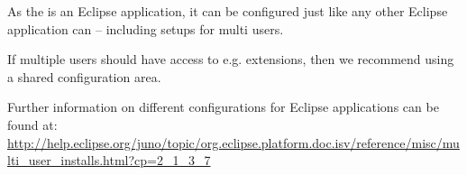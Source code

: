 As the \ite{} is an Eclipse application, it can be configured just like any other Eclipse application can -- including setups for multi users. 

If multiple users should have access to e.g. extensions, then we recommend using a shared configuration area. 

Further information on different configurations for Eclipse applications can be found at:
\url{http://help.eclipse.org/juno/topic/org.eclipse.platform.doc.isv/reference/misc/multi_user_installs.html?cp=2_1_3_7}
